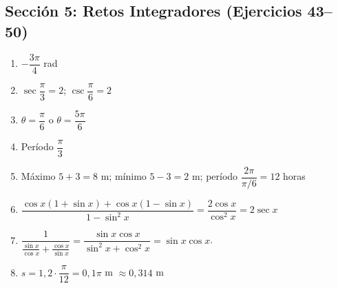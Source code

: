\documentclass[12pt, letterpaper]{article}
\begin{document}
  \subsection*{Sección 5: Retos Integradores (Ejercicios 43--50)}
  \begin{enumerate}[resume=respuestas, leftmargin=*, label=\textbf{\arabic*.}]
    \item $-\dfrac{3\pi}{4}$ rad
    \item $\sec \dfrac{\pi}{3} = 2$; \quad $\csc \dfrac{\pi}{6} = 2$
    \item $\theta = \dfrac{\pi}{6}$ o $\theta = \dfrac{5\pi}{6}$
    \item Período $\dfrac{\pi}{3}$
    \item Máximo $5 + 3 = 8$ m; \quad mínimo $5 - 3 = 2$ m; \quad período $\dfrac{2\pi}{\pi/6} = 12$ horas
    \item $\dfrac{\cos x(1 + \sin x) + \cos x(1 - \sin x)}{1 - \sin^2 x} = \dfrac{2\cos x}{\cos^2 x} = 2\sec x$
    \item $\dfrac{1}{\frac{\sin x}{\cos x} + \frac{\cos x}{\sin x}} = \dfrac{\sin x \cos x}{\sin^2 x + \cos^2 x} = \sin x \cos x$.
    \item $s = 1{,}2 \cdot \dfrac{\pi}{12} = 0{,}1\pi$ m $\approx 0{,}314$ m
  \end{enumerate}
\fi
\end{document}
